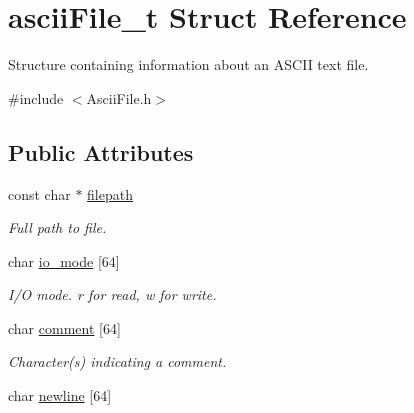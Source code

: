 \hypertarget{structasciiFile__t}{}\section{ascii\+File\+\_\+t Struct Reference}
\label{structasciiFile__t}


Structure containing information about an A\+S\+C\+II text file.  




{\ttfamily \#include $<$Ascii\+File.\+h$>$}

\subsection*{Public Attributes}
\begin{DoxyCompactItemize}
\item 
\mbox{\label{structasciiFile__t_a9141b66096494327a32fa51c6b8281cc}} 
const char $\ast$ \hyperlink{structasciiFile__t_a9141b66096494327a32fa51c6b8281cc}{filepath}
\begin{DoxyCompactList}\small\item\em Full path to file. \end{DoxyCompactList}\item 
\mbox{\label{structasciiFile__t_a89b8b86d814353fea003c9c54204d8af}} 
char \hyperlink{structasciiFile__t_a89b8b86d814353fea003c9c54204d8af}{io\+\_\+mode} \mbox{[}64\mbox{]}
\begin{DoxyCompactList}\small\item\em I/O mode. \textquotesingle{}r\textquotesingle{} for read, \textquotesingle{}w\textquotesingle{} for write. \end{DoxyCompactList}\item 
\mbox{\label{structasciiFile__t_aa6b01ebf820bd2c7bc7003e7b0669092}} 
char \hyperlink{structasciiFile__t_aa6b01ebf820bd2c7bc7003e7b0669092}{comment} \mbox{[}64\mbox{]}
\begin{DoxyCompactList}\small\item\em Character(s) indicating a comment. \end{DoxyCompactList}\item 
\mbox{\label{structasciiFile__t_aa98795a5f431ada3d3548bc9b29c936f}} 
char \hyperlink{structasciiFile__t_aa98795a5f431ada3d3548bc9b29c936f}{newline} \mbox{[}64\mbox{]}

\end{DoxyCompactItemize}
